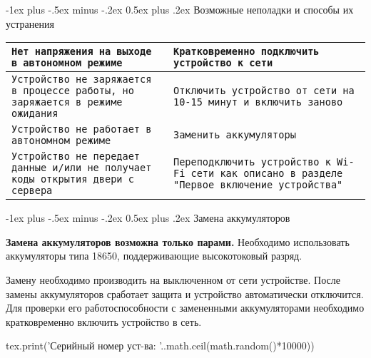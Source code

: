 \documentclass[a4paper,10pt,landscape]{article}
\makeatletter
\renewcommand{\section}{\@startsection{section}{1}{0mm}%
                                {-1ex plus -.5ex minus -.2ex}%
                                {0.5ex plus .2ex}%
                                {\normalfont\large\bfseries}}
\makeatother
\begin{document}
\begin{multicols}{3}
\section{Возможные неполадки и способы их устранения}

\noindent\begin{tabular}{p{4cm}|p{4cm}}
\hline
\texttt{Нет напряжения на выходе в автономном режиме}&\texttt{Кратковременно подключить устройство к сети}\\
\hline
\texttt{Устройство не заряжается в процессе работы, но заряжается в режиме ожидания}&\texttt{Отключить устройство от сети на 10-15 минут и включить заново}\\
\hline
\texttt{Устройство не работает в автономном режиме}&\texttt{Заменить аккумуляторы}\\
\hline
\texttt{Устройство не передает данные и/или не получает коды открытия двери с сервера}&\texttt{Переподключить устройство к Wi-Fi сети как описано в разделе "Первое включение устройства"}\\
\hline
\end{tabular}

\section{Замена аккумуляторов}

\textbf{Замена аккумуляторов возможна только парами.} Необходимо использовать аккумуляторы типа 18650, поддерживающие высокотоковый разряд. 

Замену необходимо производить на выключенном от сети устройстве. После замены аккумуляторов сработает защита и устройство автоматически отключится. Для проверки его работоспособности с замененными аккумуляторами необходимо кратковременно включить устройство в сеть. 

\Large{	
\begin{luacode}
tex.print('Серийный номер уст-ва: '..math.ceil(math.random()*10000))
\end{luacode}
}

\end{multicols}
\end{document}
